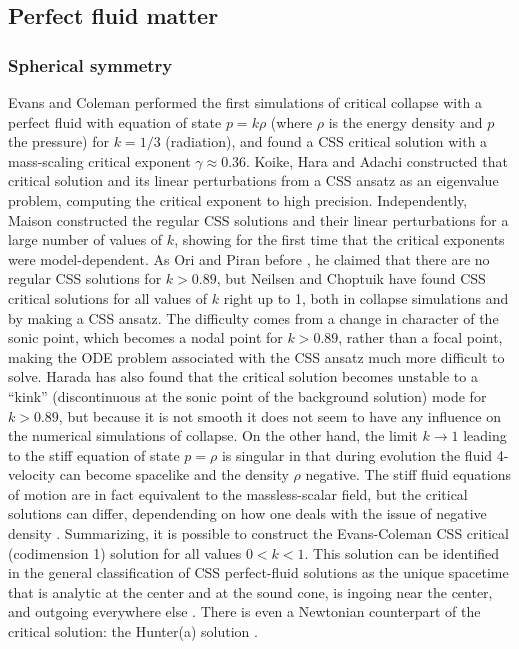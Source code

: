 \documentclass{article}
\begin{document}


\subsection{Perfect fluid matter}
\label{section:perfectfluid}

\subsubsection{Spherical symmetry}

Evans and Coleman \cite{EvansColeman} performed the first simulations
of critical collapse with a perfect fluid with equation of state
$p=k\rho $ (where $\rho$ is the energy density and $p$ the pressure)
for $k=1/3$ (radiation), and found a CSS critical solution with a
mass-scaling critical exponent $\gamma\approx 0.36$.  Koike, Hara and
Adachi \cite{KoikeHaraAdachi} constructed that critical solution and
its linear perturbations from a CSS ansatz as an eigenvalue problem,
computing the critical exponent to high precision.  Independently,
Maison \cite{Maison} constructed the regular CSS solutions and their
linear perturbations for a large number of values of $k$, showing for
the first time that the critical exponents were model-dependent. As
Ori and Piran before \cite{OriPiran,OriPiran2}, he claimed that there
are no regular CSS solutions for $k>0.89$, but Neilsen and Choptuik
\cite{NeilsenChoptuik,NeilsenChoptuik2} have found CSS critical
solutions for all values of $k$ right up to 1, both in collapse
simulations and by making a CSS ansatz. The difficulty comes from a
change in character of the sonic point, which becomes a nodal point
for $k>0.89$, rather than a focal point, making the ODE problem
associated with the CSS ansatz much more difficult to solve.
Harada \cite{Harada2} has also found that the critical solution
becomes unstable to a ``kink'' (discontinuous at the sonic point of
the background solution) mode for $k>0.89$, but because it is not
smooth it does not seem to have any influence on the
numerical simulations of collapse. On the other hand, the limit $k\to 1$
leading to the stiff equation of state $p=\rho$ is singular in that
during evolution the fluid 4-velocity can become spacelike and the
density $\rho$ negative. The stiff fluid equations of motion are in fact
equivalent to the massless-scalar field, but the critical solutions
can differ, dependending on how one deals with the issue of negative
density \cite{BradyChoptuikGundlachNeilsen}. Summarizing, it is
possible to construct the Evans-Coleman CSS critical (codimension 1)
solution for all values $0<k<1$. This solution can be identified in
the general classification of CSS perfect-fluid solutions as the
unique spacetime that is analytic at the center and at the sound cone,
is ingoing near the center, and outgoing everywhere else
\cite{CarrColey2,CarrColeyGoliathNilssonUggla,CarrGundlach}.
There is even a Newtonian counterpart of the critical solution:
the Hunter(a) solution \cite{HaradaMaeda}.
\end{document}
